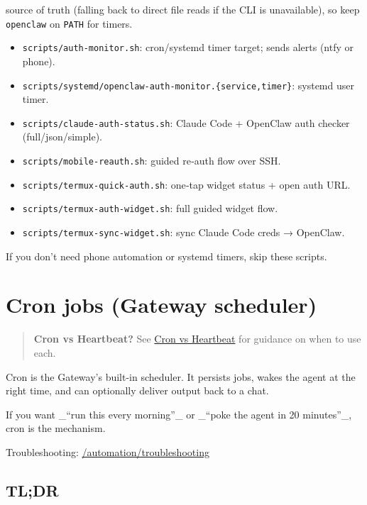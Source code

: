source of truth (falling back to direct file reads if the CLI is unavailable),
so keep \texttt{openclaw} on \texttt{PATH} for timers.
\begin{itemize}
  \item \texttt{scripts/auth-monitor.sh}: cron/systemd timer target; sends alerts (ntfy or phone).
  \item \texttt{scripts/systemd/openclaw-auth-monitor.\{service,timer\}}: systemd user timer.
  \item \texttt{scripts/claude-auth-status.sh}: Claude Code + OpenClaw auth checker (full/json/simple).
  \item \texttt{scripts/mobile-reauth.sh}: guided re‑auth flow over SSH.
  \item \texttt{scripts/termux-quick-auth.sh}: one‑tap widget status + open auth URL.
  \item \texttt{scripts/termux-auth-widget.sh}: full guided widget flow.
  \item \texttt{scripts/termux-sync-widget.sh}: sync Claude Code creds → OpenClaw.
\end{itemize}


If you don’t need phone automation or systemd timers, skip these scripts.


\clearpage

\section{Cron jobs (Gateway scheduler)}


\begin{quote}
\textbf{Cron vs Heartbeat?} See \href{/automation/cron-vs-heartbeat}{Cron vs Heartbeat} for guidance on when to use each.
\end{quote}


Cron is the Gateway’s built-in scheduler. It persists jobs, wakes the agent at
the right time, and can optionally deliver output back to a chat.

If you want \_“run this every morning”\_ or \_“poke the agent in 20 minutes”\_,
cron is the mechanism.

Troubleshooting: \href{/automation/troubleshooting}{/automation/troubleshooting}

\subsection{TL;DR}


